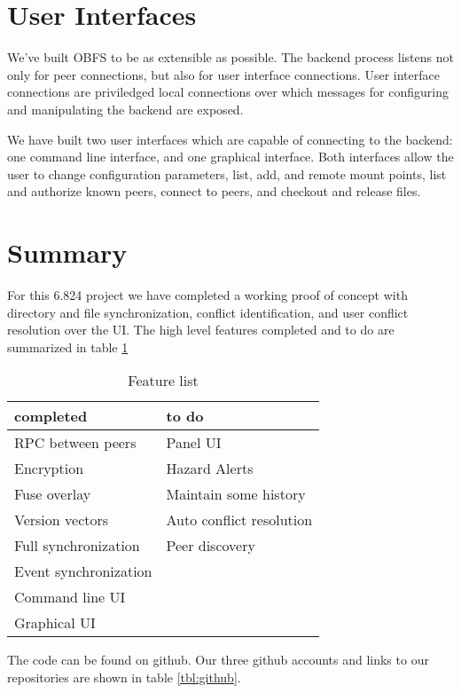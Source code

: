 \documentclass[10pt,twocolumn]{article}
\begin{document}
\section{User Interfaces}
We've built OBFS to be as extensible as possible. The backend process listens
not only for peer connections, but also for user interface connections. User
interface connections are priviledged local connections over which messages
for configuring and manipulating the backend are exposed. 

We have built two user interfaces which are capable of connecting to the 
backend: one command line interface, and one graphical interface. Both 
interfaces allow the user to change configuration parameters, list, add, and
remote mount points, list and authorize known peers, connect to peers, 
and checkout and release files. 


\section{Summary}

For this 6.824 project we have completed a working proof of concept with 
directory and file synchronization, conflict identification, and user
conflict resolution over the UI. The high level features completed and to do
are summarized in table \ref{tbl:FeatureList}


\begin{table}
    \centering
    \begin{tabular}{l|l}
        \textbf{completed}      &   \textbf{to do}  \\ \hline
        RPC between peers       &   Panel UI        \\
        Encryption              &   Hazard Alerts   \\
        Fuse overlay            &   Maintain some history   \\
        Version vectors         &   Auto conflict resolution   \\
        Full synchronization    &   Peer discovery          \\
        Event synchronization   &\\
        Command line UI         &\\
        Graphical UI            
    \end{tabular}
    \caption{Feature list}
    \label{tbl:FeatureList}
\end{table}

The code can be found on github. Our three github accounts and links to 
our repositories are shown in table \ref{tbl:github}. 
\end{document}
